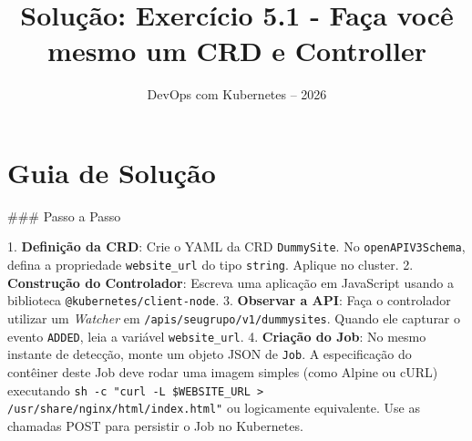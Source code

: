 \documentclass[11pt,a4paper]{article}
\title{\color{secondary}\Huge\textbf{Solução: Exercício 5.1 - Faça você mesmo um CRD e Controller}}
\author{\color{primary}DevOps com Kubernetes -- 2026}
\date{}
\begin{document}
\maketitle

\section*{\color{primary}Guia de Solução}
\begin{tcolorbox}[colback=green!5!white,colframe=green!60!black,title=Resolução Passo a Passo]
### Passo a Passo

1. \textbf{Definição da CRD}: Crie o YAML da CRD \texttt{DummySite}. No \texttt{openAPIV3Schema}, defina a propriedade \texttt{website_url} do tipo \texttt{string}. Aplique no cluster.
2. \textbf{Construção do Controlador}: Escreva uma aplicação em JavaScript usando a biblioteca \texttt{@kubernetes/client-node}. 
3. \textbf{Observar a API}: Faça o controlador utilizar um \textit{Watcher} em \texttt{/apis/seugrupo/v1/dummysites}. Quando ele capturar o evento \texttt{ADDED}, leia a variável \texttt{website_url}.
4. \textbf{Criação do Job}: No mesmo instante de detecção, monte um objeto JSON de \texttt{Job}. A especificação do contêiner deste Job deve rodar uma imagem simples (como Alpine ou cURL) executando \texttt{sh -c "curl -L \$WEBSITE_URL > /usr/share/nginx/html/index.html"} ou logicamente equivalente. Use as chamadas POST para persistir o Job no Kubernetes.
\end{tcolorbox}
\end{document}
